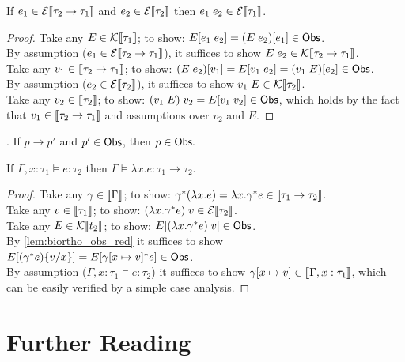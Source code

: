 \begin{lemma}
  If $e_1 \in \mathcal{E}\llbracket\tau_2 \to \tau_1\rrbracket$
  and $e_2 \in \mathcal{E}\llbracket\tau_2\rrbracket$
  then $e_1\;e_2 \in \mathcal{E}\llbracket\tau_1\rrbracket$.
\end{lemma}
\begin{proof}
  Take any $E \in \mathcal{K}\llbracket\tau_1\rrbracket$;
    to show: $E[e_1\;e_2] = (E\;e_2)[e_1] \in \mathsf{Obs}$. \\
  By assumption ($e_1 \in \mathcal{E}\llbracket\tau_2 \to \tau_1\rrbracket$),
    it suffices to show $E\;e_2 \in \mathcal{K}\llbracket\tau_2 \to \tau_1\rrbracket$. \\
  Take any $v_1 \in \llbracket\tau_2 \to \tau_1\rrbracket$;
    to show: $(E\;e_2)[v_1] = E[v_1\;e_2] = (v_1\;E)[e_2] \in \mathsf{Obs}$. \\
  By assumption ($e_2 \in \mathcal{E}\llbracket\tau_2\rrbracket$),
    it suffices to show $v_1\;E\in\mathcal{K}\llbracket\tau_2\rrbracket$. \\
  Take any $v_2 \in \llbracket\tau_2\rrbracket$;
    to show: $(v_1\;E)\;v_2 = E[v_1\;v_2] \in \mathsf{Obs}$, which holds
    by the fact that $v_1\in\llbracket\tau_2\to\tau_1\rrbracket$
    and assumptions over $v_2$ and $E$.
\end{proof}

\begin{lemma}\label{lem:biortho_obs_red}.
  If $p \longrightarrow p'$ and $p' \in \mathsf{Obs}$, then $p \in \mathsf{Obs}.$
\end{lemma}

\begin{lemma}
  If $\Gamma,x : \tau_1 \models e : \tau_2$
  then $\Gamma\models \lambda x.e : \tau_1 \to \tau_2$.
\end{lemma}
\begin{proof}
  Take any $\gamma \in \llbracket\Gamma\rrbracket$;
    to show: $\gamma^*(\lambda x.e) =
      \lambda x.\gamma^* e \in \llbracket\tau_1 \to \tau_2\rrbracket$. \\
  Take any $v \in \llbracket\tau_1\rrbracket$;
    to show: $(\lambda x.\gamma^* e)\;v \in \mathcal{E}\llbracket\tau_2\rrbracket$.\\
  Take any $E \in \mathcal{K}\llbracket t_2\rrbracket$;
    to show: $E[(\lambda x.\gamma^* e)\;v] \in \mathsf{Obs}$.\\
  By \autoref{lem:biortho_obs_red} it suffices to show
    $E[(\gamma^* e)\{v/x\}] = E[\gamma[x\mapsto v]^* e] \in \mathsf{Obs}$. \\
  By assumption ($\Gamma,x : \tau_1\models e : \tau_2$)
    it suffices to show $\gamma[x\mapsto v] \in \llbracket\Gamma,x : \tau_1\rrbracket$,
    which can be easily verified by a simple case analysis.
\end{proof}

\section{Further Reading}

